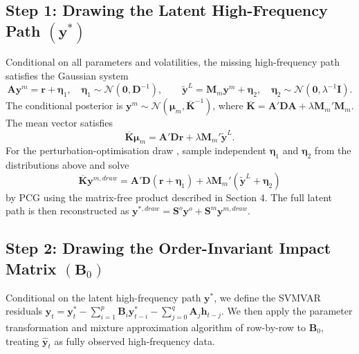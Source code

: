 \documentclass[12pt]{article}
\begin{document}
\subsection{Step 1: Drawing the Latent High-Frequency Path \texorpdfstring{$(\mathbf{y}^*)$}{(y*)}}
Conditional on all parameters and volatilities, the missing high-frequency path satisfies the Gaussian system
\begin{equation}
    \mathbf{A}\mathbf{y}^m = \mathbf{r}+\bm{\eta}_1, 
    \quad \bm{\eta}_1\sim\mathcal{N}(\mathbf{0},\mathbf{D}^{-1}),
    \qquad
    \tilde{\mathbf{y}}^L = \mathbf{M}_m\mathbf{y}^m+\bm{\eta}_2,
    \quad \bm{\eta}_2\sim\mathcal{N}(\mathbf{0},\lambda^{-1}\mathbf{I}).
\end{equation}
The conditional posterior is $\mathbf{y}^m \sim \mathcal{N}(\bm{\mu}_{m}, \overline{\mathbf{K}}^{-1})$, where $\overline{\mathbf{K}}=\mathbf{A}'\mathbf{D}\mathbf{A}+\lambda\mathbf{M}_m'\mathbf{M}_m$. The mean vector satisfies
\begin{equation}
    \overline{\mathbf{K}} \bm{\mu}_{m} = \mathbf{A}' \mathbf{D} \mathbf{r} + \lambda \mathbf{M}_m' \tilde{\mathbf{y}}^L .
\end{equation}
For the perturbation-optimisation draw \citep{papandreou2010gaussian,bardsley2012mcmc}, sample independent $\bm{\eta}_1$ and $\bm{\eta}_2$ from the distributions above and solve
\begin{equation}
    \overline{\mathbf{K}} \mathbf{y}^{m,draw}
    =
    \mathbf{A}'\mathbf{D}(\mathbf{r}+\bm{\eta}_1)
    +\lambda \mathbf{M}_m'(\tilde{\mathbf{y}}^L+\bm{\eta}_2)
\end{equation}
by PCG using the matrix-free product described in Section 4. The full latent path is then reconstructed as $\mathbf{y}^{*,draw}=\mathbf{S}^o\mathbf{y}^o+\mathbf{S}^m\mathbf{y}^{m,draw}$.

\subsection{Step 2: Drawing the Order-Invariant Impact Matrix \texorpdfstring{$(\mathbf{B}_0)$}{(B0)}}
Conditional on the latent high-frequency path $\mathbf{y}^*$, we define the SVMVAR residuals $\hat{\mathbf{y}}_t = \mathbf{y}_t^* - \sum_{i=1}^p \mathbf{B}_i \mathbf{y}_{t-i}^* - \sum_{j=0}^q \mathbf{A}_j \mathbf{h}_{t-j}$. We then apply the parameter transformation and mixture approximation algorithm of \citet{davidson2025investigating} row-by-row to $\mathbf{B}_0$, treating $\hat{\mathbf{y}}_t$ as fully observed high-frequency data.
\end{document}
